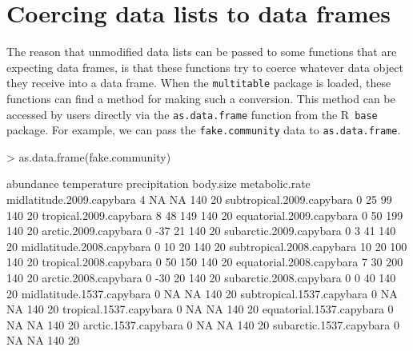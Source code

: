 \documentclass{article}
\newcommand{\R}{{\sf R}}
\newcommand{\code}[1]{\texttt{#1}}
\numberwithin{exercise}{section}
\begin{document}
\section{Coercing data lists to data frames}

The reason that unmodified data lists can be passed to some functions that are expecting data frames, is that these functions try to coerce whatever data object they receive into a data frame.  When the \code{multitable} package is loaded, these functions can find a method for making such a conversion.  This method can be accessed by users directly via the \code{as.data.frame} function from the \R\ \code{base} package.  For example, we can pass the \code{fake.community} data to \code{as.data.frame}.
\begin{Schunk}
\begin{Sinput}
> as.data.frame(fake.community)
\end{Sinput}
\begin{Soutput}
                          abundance temperature precipitation body.size metabolic.rate
midlatitude.2009.capybara         4          NA            NA       140             20
subtropical.2009.capybara         0          25            99       140             20
tropical.2009.capybara            8          48           149       140             20
equatorial.2009.capybara          0          50           199       140             20
arctic.2009.capybara              0         -37            21       140             20
subarctic.2009.capybara           0           3            41       140             20
midlatitude.2008.capybara         0          10            20       140             20
subtropical.2008.capybara        10          20           100       140             20
tropical.2008.capybara            0          50           150       140             20
equatorial.2008.capybara          7          30           200       140             20
arctic.2008.capybara              0         -30            20       140             20
subarctic.2008.capybara           0           0            40       140             20
midlatitude.1537.capybara         0          NA            NA       140             20
subtropical.1537.capybara         0          NA            NA       140             20
tropical.1537.capybara            0          NA            NA       140             20
equatorial.1537.capybara          0          NA            NA       140             20
arctic.1537.capybara              0          NA            NA       140             20
subarctic.1537.capybara           0          NA            NA       140             20

\end{Soutput}
\end{Schunk}
\end{document}
